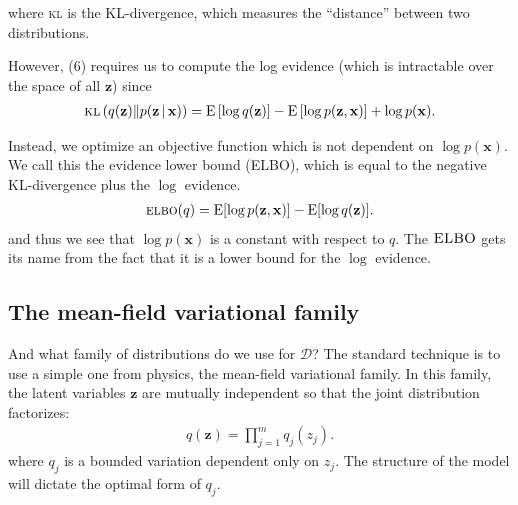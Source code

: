 \documentclass[11pt]{article}
\newcommand{\bx}{\ensuremath{\mathbf{x}}}
\newcommand{\bz}{\ensuremath{\mathbf{z}}}
\newcommand{\kl}[1]{\textsc{kl}\left(#1\right)}
\newcommand{\g}{\,\vert\,}
\newcommand{\ELBO}{\textsc{elbo}}
\newcommand{\E}{\mathrm{E}}
\begin{document}
where \textsc{kl} is the KL-divergence, which measures the ``distance'' between two distributions. 

However, (6) requires us to compute the log evidence (which is intractable over the space of all $\mathbf{z}$) since 
\begin{align}
  \kl{q(\bz) \| p(\bz \g \bx)} =
  \E\left[\log q(\bz)\right] -
  \E\left[\log p(\bz, \bx)\right] +
  \log p(\bx). 
\end{align}

Instead, we optimize an objective function which is not dependent on $\log p(\bx)$. We call this the evidence lower bound (\textsc{ELBO}), which is equal to the negative \textsc{KL}-divergence plus the $\log$ evidence.
\begin{align}
  \ELBO(q) =
  \E{[\log p(\bz, \bx)]} -
  \E{[\log q(\bz)]}.
\end{align}
and thus we see that $\log p(\bx)$ is a constant with respect to $q$. The $\textsc{ELBO}$ gets its name from the fact that it is a lower bound for the $\log$ evidence. 

\subsection{The mean-field variational family}
And what family of distributions do we use for $\mathcal{D}$? The standard technique is to use a simple one from physics, the mean-field variational family. In this family, the latent variables $\bz$ are mutually independent so that the joint distribution factorizes:
\begin{align}
  q(\bz) = \prod_{j=1}^{m} q_j(z_j).
\end{align}
where $q_j$ is a bounded variation dependent only on $z_j$. The structure of the model will dictate the optimal form of $q_j$. 
\end{document}
